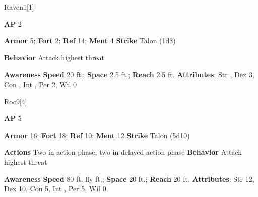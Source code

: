 \begin{monsection}{Raven}{1}[1]
\vspace{-1em}\vspace{-1em}
\begin{spellcontent}
\begin{spelltargetinginfo}
{\textbf{AP} 2}

\pari \textbf{Armor} 5;
\textbf{Fort} 2;
\textbf{Ref} 14;
\textbf{Ment} 4
\pari \textbf{Strike} Talon  (1d3)



\pari \textbf{Behavior} Attack highest threat
\end{spelltargetinginfo}
\end{spellcontent}

\begin{monsterfooter}
\pari \textbf{Awareness} 
\pari \textbf{Speed} 20 ft.;
\textbf{Space} 2.5 ft.;
\textbf{Reach} 2.5 ft.
\pari \textbf{Attributes}:
Str ,
Dex 3,
Con ,
Int ,
Per 2,
Wil 0
\end{monsterfooter}
\end{monsection}





\begin{monsection}{Roc}{9}[4]
\vspace{-1em}\vspace{-1em}
\begin{spellcontent}
\begin{spelltargetinginfo}
{\textbf{AP} 5}

\pari \textbf{Armor} 16;
\textbf{Fort} 18;
\textbf{Ref} 10;
\textbf{Ment} 12
\pari \textbf{Strike} Talon  (5d10)


\pari \textbf{Actions} Two in action phase, two in delayed action phase
\pari \textbf{Behavior} Attack highest threat
\end{spelltargetinginfo}
\end{spellcontent}

\begin{monsterfooter}
\pari \textbf{Awareness} 
\pari \textbf{Speed} 80 ft. fly ft.;
\textbf{Space} 20 ft.;
\textbf{Reach} 20 ft.
\pari \textbf{Attributes}:
Str 12,
Dex 10,
Con 5,
Int ,
Per 5,
Wil 0
\end{monsterfooter}
\end{monsection}


